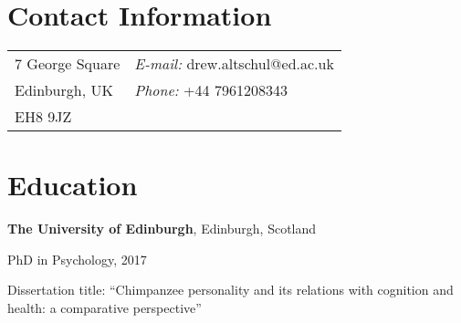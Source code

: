 \documentclass[margin,line]{res}
\newenvironment{list1}{
  \begin{list}{\ding{113}}{%
      \setlength{\itemsep}{0in}
      \setlength{\parsep}{0in} \setlength{\parskip}{0in}
      \setlength{\topsep}{0in} \setlength{\partopsep}{0in} 
      \setlength{\leftmargin}{0.17in}}}{\end{list}}
\begin{document}

\begin{resume}
\section{\sc Contact Information}
\vspace{.05in}
\begin{tabular}{@{}p{3in}p{4in}}
7 George Square  & {\it E-mail:}  drew.altschul@ed.ac.uk\\            
Edinburgh, UK & {\it Phone:} +44 7961208343 \\    
EH8 9JZ \\
\end{tabular}



%

\section{\sc Education}

{\bf The University of Edinburgh}, Edinburgh, Scotland\\
\vspace*{-.1in}
\begin{list1}
\item[] PhD in Psychology, 2017
\item[] Dissertation title: ``Chimpanzee personality and its relations with cognition and health: \linebreak a comparative perspective''
\vspace*{.05in}
\end{list1}


\end{resume}
\end{document}
